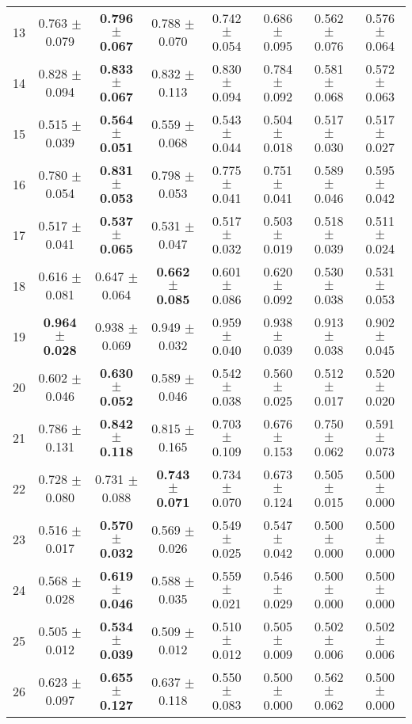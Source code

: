 \begin{table}[!ht]
{\begin{tabular}{r c c c c c c c}
13 & 0.763 $\pm$ 0.079 & \textbf{0.796 $\pm$ 0.067} & 0.788 $\pm$ 0.070 & 0.742 $\pm$ 0.054 & 0.686 $\pm$ 0.095 & 0.562 $\pm$ 0.076 & 0.576 $\pm$ 0.064 \\
14 & 0.828 $\pm$ 0.094 & \textbf{0.833 $\pm$ 0.067} & 0.832 $\pm$ 0.113 & 0.830 $\pm$ 0.094 & 0.784 $\pm$ 0.092 & 0.581 $\pm$ 0.068 & 0.572 $\pm$ 0.063 \\
15 & 0.515 $\pm$ 0.039 & \textbf{0.564 $\pm$ 0.051} & 0.559 $\pm$ 0.068 & 0.543 $\pm$ 0.044 & 0.504 $\pm$ 0.018 & 0.517 $\pm$ 0.030 & 0.517 $\pm$ 0.027 \\
16 & 0.780 $\pm$ 0.054 & \textbf{0.831 $\pm$ 0.053} & 0.798 $\pm$ 0.053 & 0.775 $\pm$ 0.041 & 0.751 $\pm$ 0.041 & 0.589 $\pm$ 0.046 & 0.595 $\pm$ 0.042 \\
17 & 0.517 $\pm$ 0.041 & \textbf{0.537 $\pm$ 0.065} & 0.531 $\pm$ 0.047 & 0.517 $\pm$ 0.032 & 0.503 $\pm$ 0.019 & 0.518 $\pm$ 0.039 & 0.511 $\pm$ 0.024 \\
18 & 0.616 $\pm$ 0.081 & 0.647 $\pm$ 0.064 & \textbf{0.662 $\pm$ 0.085} & 0.601 $\pm$ 0.086 & 0.620 $\pm$ 0.092 & 0.530 $\pm$ 0.038 & 0.531 $\pm$ 0.053 \\
19 & \textbf{0.964 $\pm$ 0.028} & 0.938 $\pm$ 0.069 & 0.949 $\pm$ 0.032 & 0.959 $\pm$ 0.040 & 0.938 $\pm$ 0.039 & 0.913 $\pm$ 0.038 & 0.902 $\pm$ 0.045 \\
20 & 0.602 $\pm$ 0.046 & \textbf{0.630 $\pm$ 0.052} & 0.589 $\pm$ 0.046 & 0.542 $\pm$ 0.038 & 0.560 $\pm$ 0.025 & 0.512 $\pm$ 0.017 & 0.520 $\pm$ 0.020 \\
21 & 0.786 $\pm$ 0.131 & \textbf{0.842 $\pm$ 0.118} & 0.815 $\pm$ 0.165 & 0.703 $\pm$ 0.109 & 0.676 $\pm$ 0.153 & 0.750 $\pm$ 0.062 & 0.591 $\pm$ 0.073 \\
22 & 0.728 $\pm$ 0.080 & 0.731 $\pm$ 0.088 & \textbf{0.743 $\pm$ 0.071} & 0.734 $\pm$ 0.070 & 0.673 $\pm$ 0.124 & 0.505 $\pm$ 0.015 & 0.500 $\pm$ 0.000 \\
23 & 0.516 $\pm$ 0.017 & \textbf{0.570 $\pm$ 0.032} & 0.569 $\pm$ 0.026 & 0.549 $\pm$ 0.025 & 0.547 $\pm$ 0.042 & 0.500 $\pm$ 0.000 & 0.500 $\pm$ 0.000 \\
24 & 0.568 $\pm$ 0.028 & \textbf{0.619 $\pm$ 0.046} & 0.588 $\pm$ 0.035 & 0.559 $\pm$ 0.021 & 0.546 $\pm$ 0.029 & 0.500 $\pm$ 0.000 & 0.500 $\pm$ 0.000 \\
25 & 0.505 $\pm$ 0.012 & \textbf{0.534 $\pm$ 0.039} & 0.509 $\pm$ 0.012 & 0.510 $\pm$ 0.012 & 0.505 $\pm$ 0.009 & 0.502 $\pm$ 0.006 & 0.502 $\pm$ 0.006 \\
26 & 0.623 $\pm$ 0.097 & \textbf{0.655 $\pm$ 0.127} & 0.637 $\pm$ 0.118 & 0.550 $\pm$ 0.083 & 0.500 $\pm$ 0.000 & 0.562 $\pm$ 0.062 & 0.500 $\pm$ 0.000 \\

\end{tabular}}
\end{table}

